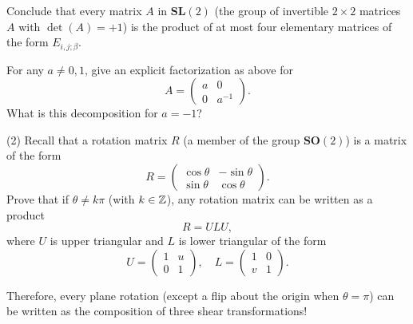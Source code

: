 \documentclass[12pt]{article}
\begin{document}
\medskip
Conclude that every matrix $A$ in $\mathbf{SL}(2)$ 
(the group of invertible $2\times 2$ matrices $A$ with
$\det(A) = +1$)  is the product of
at most four elementary matrices
of the form $E_{i, j; \beta}$.

\medskip
For any $a\not= 0, 1$, give an explicit factorization as above for
\[
A = 
\begin{pmatrix}
a & 0 \\
0 & a^{-1}
\end{pmatrix}.
\]
What is this decomposition for $a = -1$?

\medskip
(2)
Recall that a rotation matrix $R$ (a member of the group
$\mathbf{SO}(2)$)  is a matrix of the form
\[
R = 
\begin{pmatrix}
\cos\theta & -\sin\theta \\
\sin\theta & \cos\theta
\end{pmatrix}.
\]
Prove that if $\theta \not= k \pi$ (with $k \in {\mathbb Z}$), 
any rotation matrix can be written as a product 
\[
R = U L U,
\] 
where $U$ is upper triangular and $L$ is lower triangular 
of the form
\[
U = 
\begin{pmatrix}
1 & u \\
0 & 1
\end{pmatrix},
\quad
L = 
\begin{pmatrix}
1 & 0 \\
v & 1
\end{pmatrix}.
\]

\medskip
Therefore, every plane rotation (except a flip about the origin when 
$\theta = \pi$) can be written as the composition of three
shear transformations!
\end{document}
